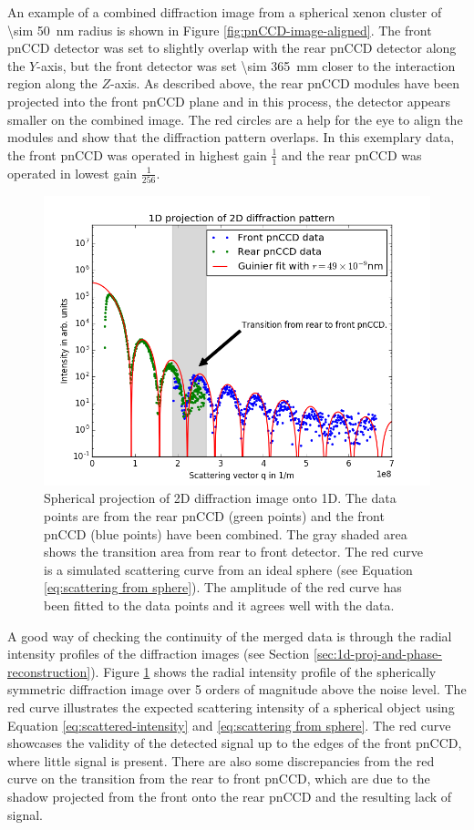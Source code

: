 %
An example of a combined diffraction image from a spherical xenon cluster of \SI{\sim 50}{\nano\meter} radius is shown in Figure \ref{fig:pnCCD-image-aligned}. The front pnCCD detector was set to slightly overlap with the rear pnCCD detector along the $Y$-axis, but the front detector was set \SI{\sim 365}{\milli\meter} closer to the interaction region along the $Z$-axis. As described above, the rear pnCCD modules have been projected into the front pnCCD plane and in this process, the detector appears smaller on the combined image. The red circles are a help for the eye to align the modules and show that the diffraction pattern overlaps. In this exemplary data, the front pnCCD was operated in highest gain $\frac{1}{1}$ and the rear pnCCD was operated in lowest gain $\frac{1}{256}$.\\[1\baselineskip]
\begin{figure}
	\centering
		\includegraphics[height=0.50\textwidth]{images/pnCCD-1d-sum.png}
	\caption[Spherical projection of 2D diffraction image onto 1D.]{Spherical projection of 2D diffraction image onto 1D. The data points are from the rear pnCCD (green points) and the front pnCCD (blue points) have been combined. The gray shaded area shows the transition area from rear to front detector. The red curve is a simulated scattering curve from an ideal sphere (see Equation \eqref{eq:scattering from sphere}). The amplitude of the red curve has been fitted to the data points and it agrees well with the data.}
	\label{fig:pnCCD-1d-sum}
\end{figure}
A good way of checking the continuity of the merged data is through the radial intensity profiles of the diffraction images (see Section \ref{sec:1d-proj-and-phase-reconstruction}). Figure \ref{fig:pnCCD-1d-sum} shows the radial intensity profile of the spherically symmetric diffraction image over 5 orders of magnitude above the noise level. The red curve illustrates the expected scattering intensity of a spherical object using Equation \eqref{eq:scattered-intensity} and \eqref{eq:scattering from sphere}. The red curve showcases the validity of the detected signal up to the edges of the front pnCCD, where little signal is present. There are also some discrepancies from the red curve on the transition from the rear to front pnCCD, which are due to the shadow projected from the front onto the rear pnCCD and the resulting lack of signal. 
%
%
%
